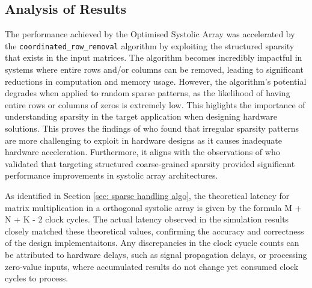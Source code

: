 \documentclass[12pt, a4paper, ukenglish]{article}
\begin{document}
    \subsection{Analysis of Results} \label{sec: analysis}


    The performance achieved by the Optimised Systolic Array was accelerated by the \newline \texttt{coordinated\_row\_removal} algorithm by exploiting the structured sparsity that exists in the input matrices. The algorithm becomes incredibly impactful in systems where entire rows and/or columns can be removed, leading to significant reductions in computation and memory usage. However, the algorithm's potential degrades when applied to random sparse patterns, as the likelihood of having entire rows or columns of zeros is extremely low. This higlights the importance of understanding sparsity in the target application when designing hardware solutions. This proves the findings of \textcite{sun_sense_2023} who found that irregular sparsity patterns are more challenging to exploit in hardware designs as it causes inadequate hardware acceleration. Furthermore, it aligns with the observations of \textcite{palacios_systolic_2025} who validated that targeting structured coarse-grained sparsity provided significant performance improvements in systolic array architectures.

    As identified in Section \ref{sec: sparse handling algo}, the theoretical latency for matrix multiplication in a orthogonal systolic array is given by the formula M + N + K - 2 clock cycles. The actual latency observed in the simulation results closely matched these theoretical values, confirming the accuracy and correctness of the design implementaitons. Any discrepancies in the clock cyucle counts can be attributed to hardware delays, such as signal propagation delays, or processing zero-value inputs, where accumulated results do not change yet consumed clock cycles to process.
\end{document}
